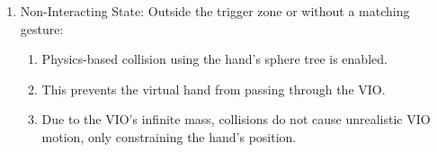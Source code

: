 \begin{enumerate}
\begin{enumerate}
      \item Non-Interacting State: Outside the trigger zone or without a matching gesture: 
      \begin{enumerate}
        \item Physics-based collision using the hand's sphere tree is enabled. 
        \item This prevents the virtual hand from passing through the VIO. 
        \item Due to the VIO's infinite mass, collisions do not cause unrealistic VIO motion, only constraining the hand's position.
      \end{enumerate}
  \end{enumerate}

\end{enumerate}